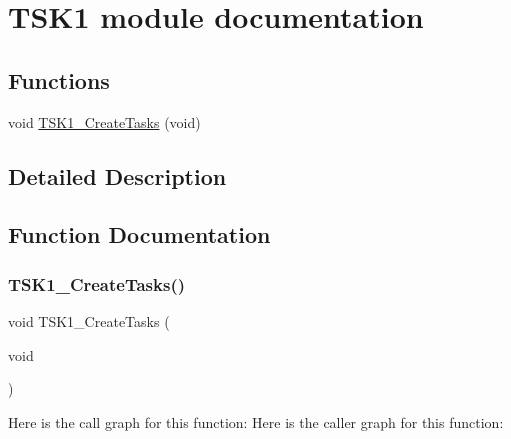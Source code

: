\hypertarget{group___t_s_k1__module}{}\section{T\+S\+K1 module documentation}
\label{group___t_s_k1__module}
\subsection*{Functions}
\begin{DoxyCompactItemize}
\item 
void \hyperlink{group___t_s_k1__module_ga3a507595ac3b4690dea3d794dac25a0f}{T\+S\+K1\+\_\+\+Create\+Tasks} (void)
\end{DoxyCompactItemize}


\subsection{Detailed Description}


\subsection{Function Documentation}
\mbox{\label{group___t_s_k1__module_ga3a507595ac3b4690dea3d794dac25a0f}} 
\subsubsection{\texorpdfstring{T\+S\+K1\+\_\+\+Create\+Tasks()}{TSK1\_CreateTasks()}}
{\footnotesize\ttfamily void T\+S\+K1\+\_\+\+Create\+Tasks (\begin{DoxyParamCaption}\item[{void}]{ }\end{DoxyParamCaption})}

Here is the call graph for this function\+:
Here is the caller graph for this function\+:
